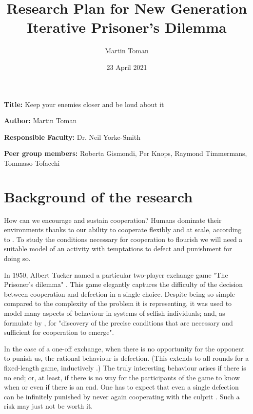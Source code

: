 \documentclass[english]{article}
\title{Research Plan for New Generation Iterative Prisoner's Dilemma}
\author{Martin Toman}
\date{23 April 2021}
\newcommand{\namelistlabel}[1]{\mbox{#1}\hfil}
\newenvironment{namelist}[1]{%
\begin{list}{}{
  \let\makelabel\namelistlabel
  \settowidth{\labelwidth}{#1}
  \setlength{\leftmargin}{1.1\labelwidth}
}}{%
\end{list}}
\begin{document}
\listoftodos

\maketitle
\begin{namelist}{}
\item[{\bf Title:}]
  Keep your enemies closer and be loud about it
\item[{\bf Author:}]
  Martin Toman
\item[{\bf Responsible Faculty:}]
  Dr. Neil Yorke-Smith
\item[{\bf Peer group members:}]
  Roberta Gismondi,
  Per Knops,
  Raymond Timmermans,
  Tommaso Tofacchi
\end{namelist}



\section*{Background of the research}

How can we encourage and sustain cooperation? Humans dominate their environments thanks to our ability to cooperate flexibly and at scale, according to \citet{harari-sapiens}.
To study the conditions necessary for cooperation to flourish we will need a suitable model of an activity with temptations to defect and punishment for doing so.

In 1950, Albert Tucker named a particular two-player exchange game "The Prisoner's dilemma" \citep{sep-prisoner-dilemma}.
This game elegantly captures the difficulty of the decision between cooperation and defection in a single choice.
Despite being so simple compared to the complexity of the problem it is representing, it was used to model many aspects of behaviour in systems of selfish individuals; and, as formulate by \citet{Axelrod84}, for "discovery of the precise conditions that are necessary and sufficient for cooperation to emerge".

In the case of a one-off exchange, when there is no opportunity for the opponent to punish us, the rational behaviour is defection. (This extends to all rounds for a fixed-length game, inductively \citep{Axelrod84}.)
The truly interesting behaviour arises if there is no end; or, at least, if there is no way for the participants of the game to know when or even if there is an end.
One has to expect that even a single defection can be infinitely punished by never again cooperating with the culprit \citep{GRIM}.
Such a risk may just not be worth it.
\end{document}
